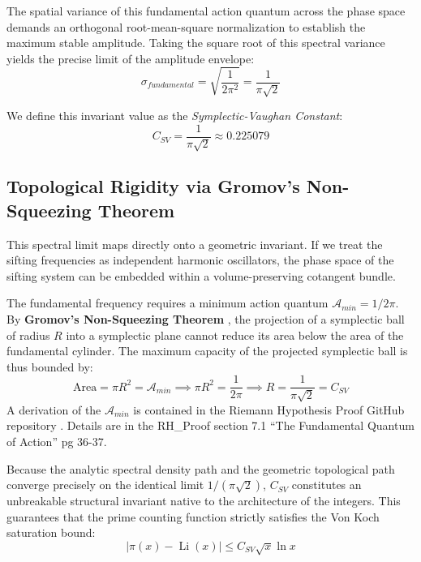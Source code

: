 \documentclass[twoside,9pt]{extarticle}
\begin{document}
The spatial variance of this fundamental action quantum across the phase space demands an orthogonal root-mean-square normalization to establish the maximum stable amplitude. Taking the square root of this spectral variance yields the precise limit of the amplitude envelope:
\begin{equation}
\sigma_{fundamental} = \sqrt{\frac{1}{2\pi^2}} = \frac{1}{\pi\sqrt{2}}
\end{equation}

We define this invariant value as the \textit{Symplectic-Vaughan Constant}:
\begin{equation}
\label{eq:csv_definition}
C_{SV} = \frac{1}{\pi\sqrt{2}} \approx 0.225079
\end{equation}

\subsection{Topological Rigidity via Gromov's Non-Squeezing Theorem}
This spectral limit maps directly onto a geometric invariant. If we treat the sifting frequencies as independent harmonic oscillators, the phase space of the sifting system can be embedded within a volume-preserving cotangent bundle. 

The fundamental frequency requires a minimum action quantum $\mathcal{A}_{min} = 1/2\pi$. By \textbf{Gromov's Non-Squeezing Theorem} \cite{mcduff2017introduction}, the projection of a symplectic ball of radius $R$ into a symplectic plane cannot reduce its area below the area of the fundamental cylinder. The maximum capacity of the projected symplectic ball is thus bounded by:
\begin{equation}
\text{Area} = \pi R^2 = \mathcal{A}_{min} \implies \pi R^2 = \frac{1}{2\pi} \implies R = \frac{1}{\pi\sqrt{2}} = C_{SV}
\end{equation}
A derivation of the $\mathcal{A}_{min}$ is contained in the Riemann Hypothesis Proof GitHub repository \cite{Rock2026Repository}. Details are in the RH\_Proof section 7.1 ``The Fundamental Quantum of Action'' pg 36-37.

Because the analytic spectral density path and the geometric topological path converge precisely on the identical limit $1/(\pi\sqrt{2})$, $C_{SV}$ constitutes an unbreakable structural invariant native to the architecture of the integers. This guarantees that the prime counting function strictly satisfies the Von Koch saturation bound:
\begin{equation}
\label{eq:von_koch}
|\pi(x) - \operatorname{Li}(x)| \le C_{SV} \sqrt{x} \ln x  
\end{equation}
\end{document}
